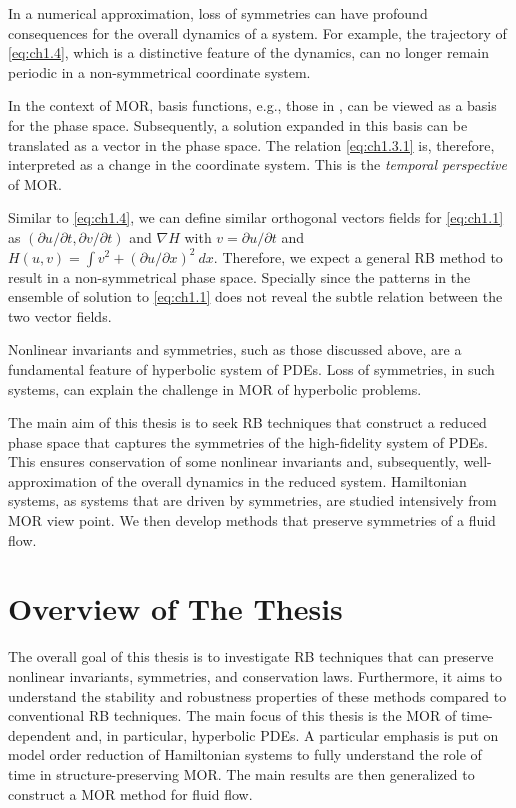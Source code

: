 In a numerical approximation, loss of symmetries can have profound consequences for the overall dynamics of a system. For example, the trajectory of \eqref{eq:ch1.4}, which is a distinctive feature of the dynamics, can no longer remain periodic in a non-symmetrical coordinate system.

In the context of MOR, basis functions, e.g., those in , can be viewed as a basis for the phase space. Subsequently, a solution expanded in this basis can be translated as a vector in the phase space. The relation \eqref{eq:ch1.3.1} is, therefore, interpreted as a change in the coordinate system. This is the \emph{temporal perspective} of MOR.  

Similar to \eqref{eq:ch1.4}, we can define similar orthogonal vectors fields for \eqref{eq:ch1.1} as $(\partial u/\partial t,\partial v/\partial t)$ and $\nabla H$ with $v = \partial u/\partial t$ and $H(u,v) = \int v^2 + (\partial u / \partial x)^2 \ dx$. Therefore, we expect a general RB method to result in a non-symmetrical phase space. Specially since the patterns in the ensemble of solution to \eqref{eq:ch1.1} does not reveal the subtle relation between the two vector fields.

Nonlinear invariants and symmetries, such as those discussed above, are a fundamental feature of hyperbolic system of PDEs. Loss of symmetries, in such systems, can explain the challenge in MOR of hyperbolic problems.

The main aim of this thesis is to seek RB techniques that construct a reduced phase space that captures the symmetries of the high-fidelity system of PDEs. This ensures conservation of some nonlinear invariants and, subsequently, well-approximation of the overall dynamics in the reduced system. Hamiltonian systems, as systems that are driven by symmetries, are studied intensively from MOR view point. We then develop methods that preserve symmetries of a fluid flow.

\section*{Overview of The Thesis}
The overall goal of this thesis is to investigate RB techniques that can preserve nonlinear invariants, symmetries, and conservation laws. Furthermore, it aims to understand the stability and robustness properties of these methods compared to conventional RB techniques. The main focus of this thesis is the MOR of time-dependent and, in particular, hyperbolic PDEs. A particular emphasis is put on model order reduction of Hamiltonian systems to fully understand the role of time in structure-preserving MOR. The main results are then generalized to construct a MOR method for fluid flow.

